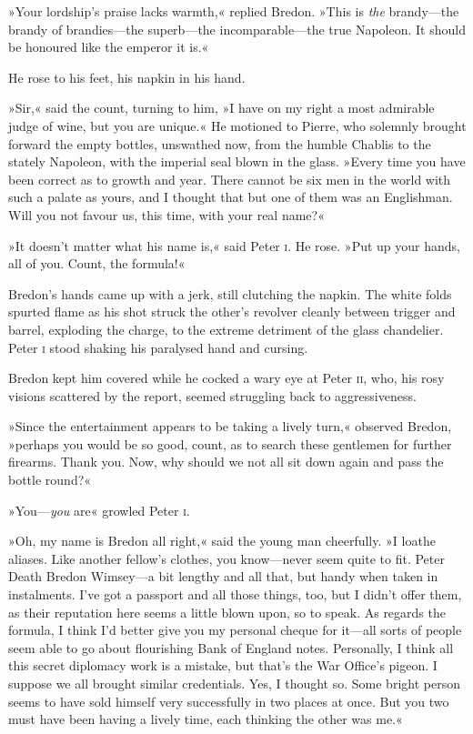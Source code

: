 »Your lordship's praise lacks warmth,« replied Bredon. »This is \textit{the} brandy—the brandy of brandies—the superb—the incomparable—the true Napoleon. It should be honoured like the emperor it is.«

He rose to his feet, his napkin in his hand.

»Sir,« said the count, turning to him, »I have on my right a most admirable judge of wine, but you are unique.« He motioned to Pierre, who solemnly brought forward the empty bottles, unswathed now, from the humble Chablis to the stately Napoleon, with the imperial seal blown in the glass. »Every time you have been correct as to growth and year. There cannot be six men in the world with such a palate as yours, and I thought that but one of them was an Englishman. Will you not favour us, this time, with your real name?«

»It doesn't matter what his name is,« said Peter \textsc{i}. He rose. »Put up your hands, all of you. Count, the formula!«

Bredon's hands came up with a jerk, still clutching the napkin. The white folds spurted flame as his shot struck the other's revolver cleanly between trigger and barrel, exploding the charge, to the extreme detriment of the glass chandelier. Peter \textsc{i} stood shaking his paralysed hand and cursing.

Bredon kept him covered while he cocked a wary eye at Peter \textsc{ii}, who, his rosy visions scattered by the report, seemed struggling back to aggressiveness.

»Since the entertainment appears to be taking a lively turn,« observed Bredon, »perhaps you would be so good, count, as to search these gentlemen for further firearms. Thank you. Now, why should we not all sit down again and pass the bottle round?«

»You—\textit{you} are\longdash« growled Peter \textsc{i}.

»Oh, my name is Bredon all right,« said the young man cheerfully. »I loathe aliases. Like another fellow's clothes, you know—never seem quite to fit. Peter Death Bredon Wimsey—a bit lengthy and all that, but handy when taken in instalments. I've got a passport and all those things, too, but I didn't offer them, as their reputation here seems a little blown upon, so to speak. As regards the formula, I think I'd better give you my personal cheque for it—all sorts of people seem able to go about flourishing Bank of England notes. Personally, I think all this secret diplomacy work is a mistake, but that's the War Office's pigeon. I suppose we all brought similar credentials. Yes, I thought so. Some bright person seems to have sold himself very successfully in two places at once. But you two must have been having a lively time, each thinking the other was me.«

